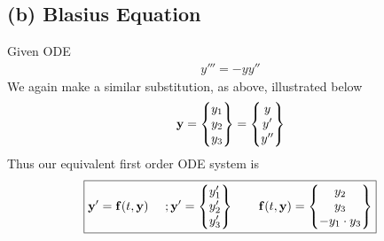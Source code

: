 \subsection*{(b) Blasius Equation}
Given ODE
\begin{align*}
y''' = -yy''
\end{align*}
We again make a similar substitution, as above, illustrated below 
\begin{align*}
{\bf y}
=
\begin{Bmatrix}
y_1\\y_2\\y_3
\end{Bmatrix}
=
\begin{Bmatrix}
y\\y'\\y''
\end{Bmatrix}
\end{align*}
Thus our equivalent first order ODE system is 
\begin{align*}
\boxed{
{\bf y}'
=
{\bf f}(t,{\bf y}) \ \ \ \ ; {\bf y}'
=
\begin{Bmatrix}
y'_1\\y'_2\\y'_3
\end{Bmatrix}
 \ \ \ \ \ \ {\bf f}(t,{\bf y}) = 
\begin{Bmatrix}
y_2\\y_3\\-y_1\cdot y_3
\end{Bmatrix}
}
\end{align*}
